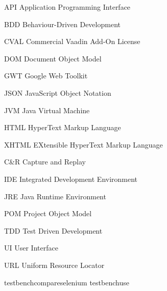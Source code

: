 \documentclass[12pt,a4paper,english%
]{tutthesis}
\begin{document}
\begin{termlist}
\item [API] Application Programming Interface
\item [BDD] Behaviour-Driven Development
\item [CVAL] Commercial Vaadin Add-On License
\item [DOM] Document Object Model
\item [GWT] Google Web Toolkit
\item [JSON] JavaScript Object Notation
\item [JVM] Java Virtual Machine
\item [HTML] HyperText Markup Language
\item [XHTML] EXtensible HyperText Markup Language
\item [C\&R]Capture and Replay
\item [IDE] Integrated Development Environment
\item [JRE] Java Runtime Environment
\item [POM] Project Object Model
\item [TDD] Test Driven Development
\item [UI] User Interface
\item [URL] Uniform Resource Locator

\end{termlist} 


\cleardoublepage

\newpage             %
\setcounter{page}{1} %
\renewcommand{\chaptername}{} %




 




 {testbenchcompareselenium}
 {testbenchuse}  


\nocite{*}

 


\end{document}

